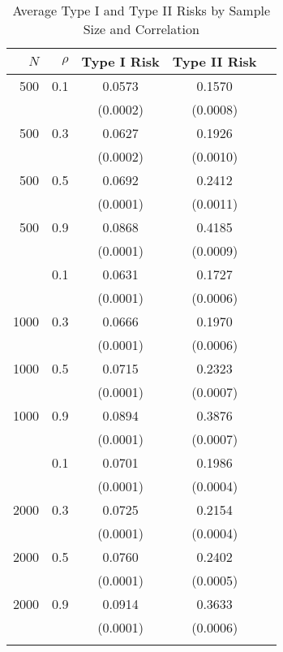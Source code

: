 \begin{table}
\caption{Average Type I and Type II Risks by Sample Size and Correlation}
\centering
\begin{tabular}{rrccc}
\toprule
$N$ & $\rho$ & \multicolumn{1}{c}{Type I Risk} & \multicolumn{1}{c}{Type II Risk} \\
\midrule
500 & 0.1 & 0.0573 & 0.1570 \\
& & (0.0002) & (0.0008) \\
500 & 0.3 & 0.0627 & 0.1926 \\
& & (0.0002) & (0.0010) \\
500 & 0.5 & 0.0692 & 0.2412 \\
& & (0.0001) & (0.0011) \\
500 & 0.9 & 0.0868 & 0.4185 \\
& & (0.0001) & (0.0009) \\
\addlinespace
1000 & 0.1 & 0.0631 & 0.1727 \\
& & (0.0001) & (0.0006) \\
1000 & 0.3 & 0.0666 & 0.1970 \\
& & (0.0001) & (0.0006) \\
1000 & 0.5 & 0.0715 & 0.2323 \\
& & (0.0001) & (0.0007) \\
1000 & 0.9 & 0.0894 & 0.3876 \\
& & (0.0001) & (0.0007) \\
\addlinespace
2000 & 0.1 & 0.0701 & 0.1986 \\
& & (0.0001) & (0.0004) \\
2000 & 0.3 & 0.0725 & 0.2154 \\
& & (0.0001) & (0.0004) \\
2000 & 0.5 & 0.0760 & 0.2402 \\
& & (0.0001) & (0.0005) \\
2000 & 0.9 & 0.0914 & 0.3633 \\
& & (0.0001) & (0.0006) \\
\addlinespace
\bottomrule
\end{tabular}
\end{table}
